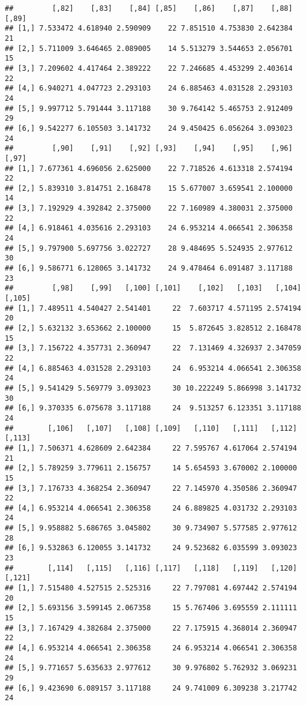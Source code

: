 \documentclass[]{article}
\begin{document}
\begin{verbatim}
##         [,82]    [,83]    [,84] [,85]    [,86]    [,87]    [,88] [,89]
## [1,] 7.533472 4.618940 2.590909    22 7.851510 4.753830 2.642384    21
## [2,] 5.711009 3.646465 2.089005    14 5.513279 3.544653 2.056701    15
## [3,] 7.209602 4.417464 2.389222    22 7.246685 4.453299 2.403614    22
## [4,] 6.940271 4.047723 2.293103    24 6.885463 4.031528 2.293103    24
## [5,] 9.997712 5.791444 3.117188    30 9.764142 5.465753 2.912409    29
## [6,] 9.542277 6.105503 3.141732    24 9.450425 6.056264 3.093023    24
##         [,90]    [,91]    [,92] [,93]    [,94]    [,95]    [,96] [,97]
## [1,] 7.677361 4.696056 2.625000    22 7.718526 4.613318 2.574194    22
## [2,] 5.839310 3.814751 2.168478    15 5.677007 3.659541 2.100000    14
## [3,] 7.192929 4.392842 2.375000    22 7.160989 4.380031 2.375000    22
## [4,] 6.918461 4.035616 2.293103    24 6.953214 4.066541 2.306358    24
## [5,] 9.797900 5.697756 3.022727    28 9.484695 5.524935 2.977612    30
## [6,] 9.586771 6.128065 3.141732    24 9.478464 6.091487 3.117188    23
##         [,98]    [,99]   [,100] [,101]    [,102]   [,103]   [,104] [,105]
## [1,] 7.489511 4.540427 2.541401     22  7.603717 4.571195 2.574194     20
## [2,] 5.632132 3.653662 2.100000     15  5.872645 3.828512 2.168478     15
## [3,] 7.156722 4.357731 2.360947     22  7.131469 4.326937 2.347059     22
## [4,] 6.885463 4.031528 2.293103     24  6.953214 4.066541 2.306358     24
## [5,] 9.541429 5.569779 3.093023     30 10.222249 5.866998 3.141732     30
## [6,] 9.370335 6.075678 3.117188     24  9.513257 6.123351 3.117188     24
##        [,106]   [,107]   [,108] [,109]   [,110]   [,111]   [,112] [,113]
## [1,] 7.506371 4.628609 2.642384     22 7.595767 4.617064 2.574194     21
## [2,] 5.789259 3.779611 2.156757     14 5.654593 3.670002 2.100000     15
## [3,] 7.176733 4.368254 2.360947     22 7.145970 4.350586 2.360947     22
## [4,] 6.953214 4.066541 2.306358     24 6.889825 4.031732 2.293103     24
## [5,] 9.958882 5.686765 3.045802     30 9.734907 5.577585 2.977612     28
## [6,] 9.532863 6.120055 3.141732     24 9.523682 6.035599 3.093023     23
##        [,114]   [,115]   [,116] [,117]   [,118]   [,119]   [,120] [,121]
## [1,] 7.515480 4.527515 2.525316     22 7.797081 4.697442 2.574194     20
## [2,] 5.693156 3.599145 2.067358     15 5.767406 3.695559 2.111111     15
## [3,] 7.167429 4.382684 2.375000     22 7.175915 4.368014 2.360947     22
## [4,] 6.953214 4.066541 2.306358     24 6.953214 4.066541 2.306358     24
## [5,] 9.771657 5.635633 2.977612     30 9.976802 5.762932 3.069231     29
## [6,] 9.423690 6.089157 3.117188     24 9.741009 6.309238 3.217742     24

\end{verbatim}
\end{document}
